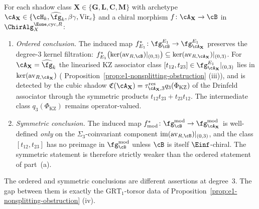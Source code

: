 \begin{corollary}
\label{cor:av-kernel-deg3-split}
For each shadow class $\mathbf{X} \in \{\mathbf{G}, \mathbf{L},
\mathbf{C}, \mathbf{M}\}$ with archetype $\cA_\mathbf{X} \in
\{\cH_k, \widehat{\fg}_k, \beta\gamma, \mathrm{Vir}_c\}$ and a
chiral morphism $f\colon \cA_\mathbf{X} \to \cB$ in
$\ChirAlg^{\Eone,\mathrm{cyc},R}_X$:
\begin{enumerate}[label=\textup{(\alph*)}]
\item \emph{Ordered conclusion.} The induced map
$f^*_{E_1}\colon \fg^{E_1}_\cB \to \fg^{E_1}_{\cA_\mathbf{X}}$
preserves the degree-$3$ kernel filtration:
$f^*_{E_1}\bigl(\ker(\operatorname{av}_{R,\cB})|_{(0,3)}\bigr)
\subseteq \ker(\operatorname{av}_{R,\cA_\mathbf{X}})|_{(0,3)}$.
For $\cA_\mathbf{X} = \widehat{\fg}_k$ the linearised KZ associator
class $[t_{12}, t_{23}] \in \fg^{E_1}_{\cA_\mathbf{X}}|_{(0,3)}$
lies in $\ker(\operatorname{av}_{R,\cA_\mathbf{X}})$ \textup{(}%
Proposition~\textup{\ref{prop:e1-nonsplitting-obstruction}}%
\textup{(iii)}\textup{)}, and is detected by the cubic shadow
$\mathfrak{C}(\cA_\mathbf{X})
=\tau_{\cA_\mathbf{X},3}^{\mathrm{res}}
q_3(\Phi_{\mathrm{KZ}})$ of the Drinfeld associator through the
symmetric products $t_{12}t_{23}+t_{23}t_{12}$.  The intermediate
class $q_3(\Phi_{\mathrm{KZ}})$ remains operator-valued.
\item \emph{Symmetric conclusion.} The induced map
$f^*_{\mathrm{mod}}\colon \fg^{\mathrm{mod}}_\cB \to
\fg^{\mathrm{mod}}_{\cA_\mathbf{X}}$ is well-defined
\emph{only} on the $\Sigma_3$-coinvariant component
$\operatorname{im}(\operatorname{av}_{R,\cB})|_{(0,3)}$, and the
class $[t_{12},t_{23}]$ has no preimage in
$\fg^{\mathrm{mod}}_\cB$ unless $\cB$ is itself
$\Einf$-chiral. The symmetric statement is therefore strictly
weaker than the ordered statement of part~\textup{(a)}.
\end{enumerate}
The ordered and symmetric conclusions are different assertions at
degree~$3$. The gap between them is exactly the
$\mathrm{GRT}_1$-torsor data of
Proposition~\textup{\ref{prop:e1-nonsplitting-obstruction}}%
\textup{(iv)}.
\end{corollary}

